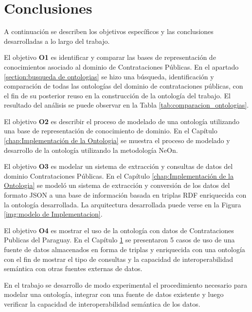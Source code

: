 \section{Conclusiones}
\label{chap:analisis}
A continuación se describen los objetivos específicos y las conclusiones desarrolladas a lo largo del trabajo.  

El objetivo \textbf{O1} es identificar y comparar las bases de representación de conocimientos asociado al dominio de Contrataciones Públicas. En el apartado \ref{section:busqueda de ontologias} se hizo una búsqueda, identificación y comparación de todas las ontologías del dominio de contrataciones públicas, con el fin de su posterior reuso en la construcción de la ontología del trabajo. El resultado del análisis se puede observar en la Tabla \ref{tab:comparacion_ontologias}.

El objetivo \textbf{O2} es describir el proceso de modelado de una ontología utilizando una base de representación de conocimiento de dominio. En el Capítulo \ref{chap:Implementación de la Ontologia} se muestra el proceso de modelado y desarrollo de la ontología utilizando la metodología NeOn.

El objetivo \textbf{O3} es modelar un sistema de extracción y consultas de datos del dominio Contrataciones Públicas. En el Capítulo \ref{chap:Implementación de la Ontologia} se modeló un sistema de extracción y conversión de los datos del formato JSON a una base de información basada en triplas RDF enriquecida con la ontología desarrollada. La arquitectura desarrollada puede verse en la Figura \ref{img:modelo de Implementacion}.

El objetivo \textbf{O4} es mostrar el uso de la ontología con datos de Contrataciones Publicas del Paraguay. En el Capítulo \ref{chap:analisis} se presentaron 5 casos de uso de una fuente de datos almacenados en forma de triplas y enriquecida con una ontología con el fin de mostrar el tipo de consultas y la capacidad de interoperabilidad semántica con otras fuentes externas de datos. 

En el trabajo se desarrollo de modo experimental el procedimiento necesario para modelar una ontología, integrar con una fuente de datos existente y luego verificar la capacidad de interoperabilidad semántica de los datos. 